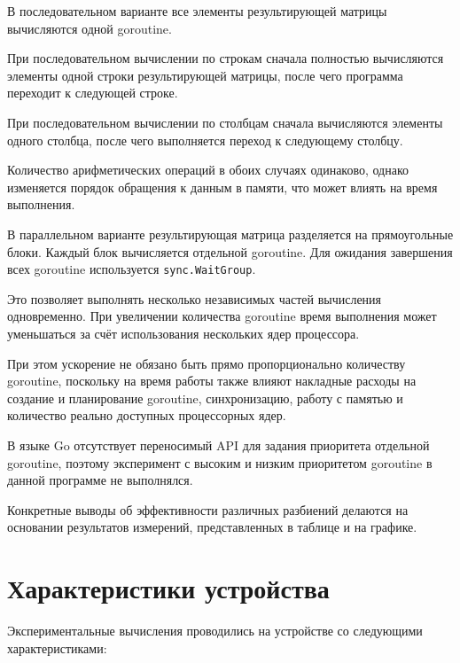 \documentclass[a4paper, 14pt]{extarticle}
\begin{document}
В последовательном варианте все элементы результирующей матрицы
вычисляются одной goroutine.

При последовательном вычислении по строкам сначала полностью
вычисляются элементы одной строки результирующей матрицы,
после чего программа переходит к следующей строке.

При последовательном вычислении по столбцам сначала вычисляются
элементы одного столбца, после чего выполняется переход к
следующему столбцу.

Количество арифметических операций в обоих случаях одинаково,
однако изменяется порядок обращения к данным в памяти,
что может влиять на время выполнения.

В параллельном варианте результирующая матрица разделяется
на прямоугольные блоки. Каждый блок вычисляется отдельной
goroutine. Для ожидания завершения всех goroutine используется
\texttt{sync.WaitGroup}.

Это позволяет выполнять несколько независимых частей вычисления
одновременно. При увеличении количества goroutine время выполнения
может уменьшаться за счёт использования нескольких ядер процессора.

При этом ускорение не обязано быть прямо пропорционально количеству
goroutine, поскольку на время работы также влияют накладные расходы
на создание и планирование goroutine, синхронизацию, работу с памятью
и количество реально доступных процессорных ядер.

В языке Go отсутствует переносимый API для задания приоритета
отдельной goroutine, поэтому эксперимент с высоким и низким
приоритетом goroutine в данной программе не выполнялся.

Конкретные выводы об эффективности различных разбиений делаются
на основании результатов измерений, представленных в таблице
и на графике.



\section{Характеристики устройства}

Экспериментальные вычисления проводились на устройстве
со следующими характеристиками:
\end{document}
